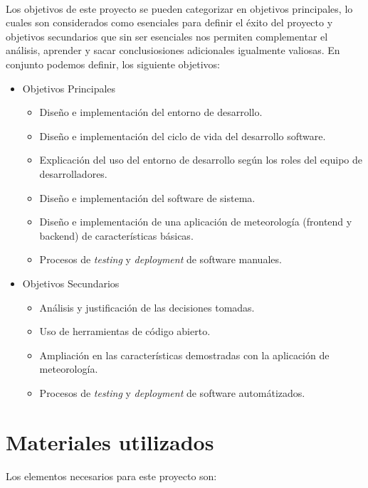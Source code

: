 \paragraph{} Los objetivos de este proyecto se pueden categorizar en objetivos principales,
lo cuales son considerados como esenciales para  definir el éxito del proyecto y
objetivos secundarios que sin ser esenciales nos permiten complementar el análisis,
aprender y sacar conclusiosiones adicionales igualmente valiosas. En conjunto podemos
definir, los siguiente objetivos:

\begin{itemize}
	\item Objetivos Principales
	\begin{itemize}
		\item Diseño e implementación del entorno de desarrollo.
		\item Diseño e implementación del ciclo de vida del desarrollo software.
		\item Explicación del uso del entorno de desarrollo según los roles del equipo
		de desarrolladores.
		\item Diseño e implementación del software de sistema.
		\item Diseño e implementación de una aplicación de meteorología (frontend y backend)
		de características básicas.
		\item Procesos de \textit{testing} y \textit{deployment} de software manuales.
	\end{itemize}
	\item Objetivos Secundarios
	\begin{itemize}
		\item Análisis y justificación de las decisiones tomadas.
		\item Uso de herramientas de código abierto.
		\item Ampliación en las características demostradas con la aplicación de
		meteorología.
		\item Procesos de \textit{testing} y \textit{deployment} de software automátizados.
	\end{itemize}
\end{itemize}


\section{Materiales utilizados}

\paragraph{}Los elementos necesarios para este proyecto son:

